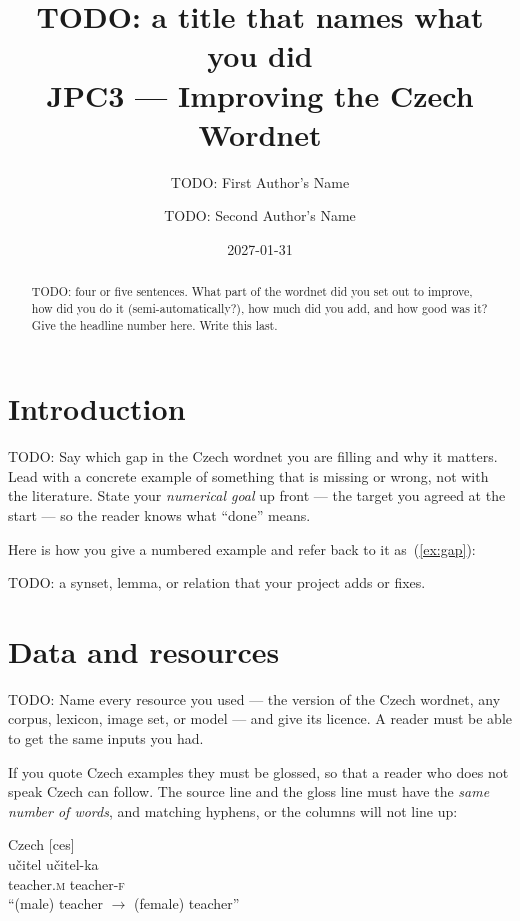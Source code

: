 \documentclass[a4paper,12pt]{article}
\title{TODO: a title that names what you did\\
  \large JPC3 --- Improving the Czech Wordnet}
\author{TODO: First Author's Name \and TODO: Second Author's Name}
\date{2027-01-31}
\newcommand{\gm}[1]{\textsc{\MakeLowercase{#1}}}
\begin{document}
\maketitle

\begin{abstract}
  TODO: four or five sentences.  What part of the wordnet did you set
  out to improve, how did you do it (semi-automatically?), how much did
  you add, and how good was it?  Give the headline number here.  Write
  this last.
\end{abstract}

\section{Introduction}

TODO: Say which gap in the Czech wordnet you are filling and why it
matters.  Lead with a concrete example of something that is missing or
wrong, not with the literature.  State your \emph{numerical goal} up
front --- the target you agreed at the start --- so the reader knows
what ``done'' means.

Here is how you give a numbered example and refer back to it
as~(\ref{ex:gap}):

\begin{exe}
  \ex \label{ex:gap} TODO: a synset, lemma, or relation that your
  project adds or fixes.
\end{exe}

\section{Data and resources}

TODO: Name every resource you used --- the version of the Czech
wordnet, any corpus, lexicon, image set, or model --- and give its
licence.  A reader must be able to get the same inputs you had.

If you quote Czech examples they must be glossed, so that a reader who
does not speak Czech can follow.  The source line and the gloss line
must have the \emph{same number of words}, and matching hyphens, or the
columns will not line up:

\begin{exe}
  \ex Czech [ces] \\
      \gll učitel \quad\textrightarrow\quad učitel-ka \\
           teacher.\gm{m} \qquad teacher-\gm{f} \\
  \trans ``(male) teacher $\rightarrow$ (female) teacher''
\end{exe}
\end{document}
